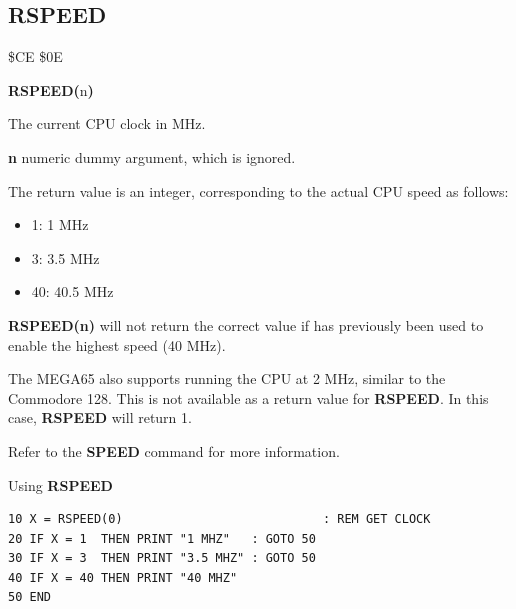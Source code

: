 \subsection{RSPEED}
\begin{description}[leftmargin=2cm,style=nextline]
\item [Token:]    \$CE \$0E

\item [Format:]   {\bf RSPEED(}n{\bf)}

\item [Returns:]  The current CPU clock in MHz.

                  {\bf n} numeric dummy argument, which is ignored.

                  The return value is an integer, corresponding to the actual CPU speed as follows:

                  \begin{itemize}
                     \item 1: 1 MHz
                     \item 3: 3.5 MHz
                     \item 40: 40.5 MHz
                  \end{itemize}

\item [Remarks:]  {\bf RSPEED(n)} will not return the correct value if  has previously been used to enable the highest speed (40 MHz).

                  The MEGA65 also supports running the CPU at 2 MHz, similar to the Commodore 128. This is not available as a return value for {\bf RSPEED}. In this case, {\bf RSPEED} will return 1.

                  Refer to the {\bf SPEED} command for more information.

\item [Example:]  Using {\bf RSPEED}

\begin{tcolorbox}[colback=black,coltext=white]
\verbatimfont{\codefont}
\begin{verbatim}
10 X = RSPEED(0)                            : REM GET CLOCK
20 IF X = 1  THEN PRINT "1 MHZ"   : GOTO 50
30 IF X = 3  THEN PRINT "3.5 MHZ" : GOTO 50
40 IF X = 40 THEN PRINT "40 MHZ"
50 END
\end{verbatim}
\end{tcolorbox}
\end{description}

